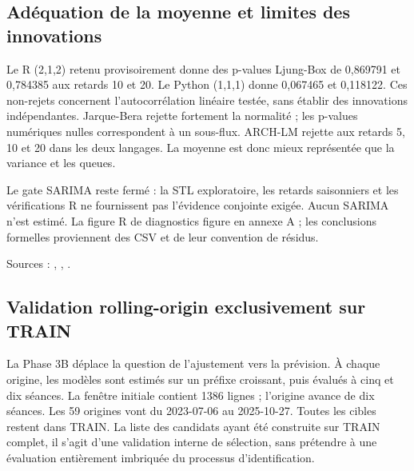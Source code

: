 \subsection{Adéquation de la moyenne et limites des innovations}



Le R (2,1,2) retenu provisoirement donne des p-values Ljung-Box de 0,869791 et 0,784385 aux retards 10 et 20. Le Python (1,1,1) donne 0,067465 et 0,118122. Ces non-rejets concernent l’autocorrélation linéaire testée, sans établir des innovations indépendantes. Jarque-Bera rejette fortement la normalité ; les p-values numériques nulles correspondent à un sous-flux. ARCH-LM rejette aux retards 5, 10 et 20 dans les deux langages. La moyenne est donc mieux représentée que la variance et les queues.



Le gate SARIMA reste fermé : la STL exploratoire, les retards saisonniers et les vérifications R ne fournissent pas l’évidence conjointe exigée. Aucun SARIMA n’est estimé. La figure R de diagnostics figure en annexe A ; les conclusions formelles proviennent des CSV et de leur convention de résidus.



Sources : , , .







\subsection{Validation rolling-origin exclusivement sur TRAIN}



La Phase 3B déplace la question de l’ajustement vers la prévision. À chaque origine, les modèles sont estimés sur un préfixe croissant, puis évalués à cinq et dix séances. La fenêtre initiale contient 1386 lignes ; l’origine avance de dix séances. Les 59 origines vont du 2023-07-06 au 2025-10-27. Toutes les cibles restent dans TRAIN. La liste des candidats ayant été construite sur TRAIN complet, il s’agit d’une validation interne de sélection, sans prétendre à une évaluation entièrement imbriquée du processus d’identification.






